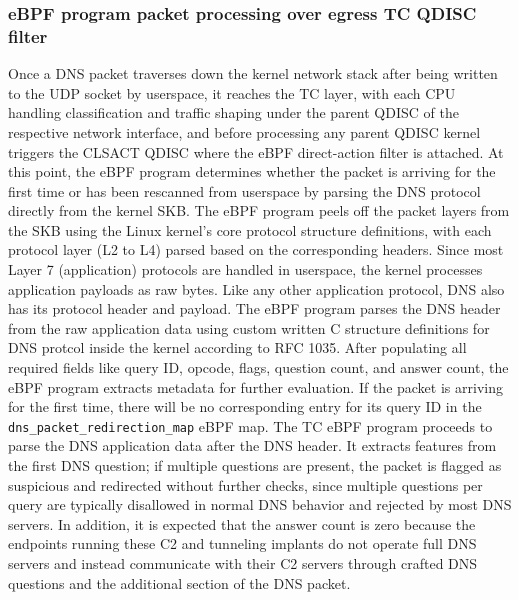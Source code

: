 \documentclass [11pt, proquest] {uwthesis}[2020/02/24]
\begin{document}
\subsubsection{\textbf{eBPF program packet processing over egress TC QDISC filter}}
\label{active:sec1}
Once a DNS packet traverses down the kernel network stack after being written to the UDP socket by userspace, it reaches the TC layer, with each CPU handling classification and traffic shaping under the parent QDISC of the respective network interface, and before processing any parent QDISC kernel triggers the CLSACT QDISC where the eBPF direct-action filter is attached. At this point, the eBPF program determines whether the packet is arriving for the first time or has been rescanned from userspace by parsing the DNS protocol directly from the kernel SKB. The eBPF program peels off the packet layers from the SKB using the Linux kernel’s core protocol structure definitions, with each protocol layer (L2 to L4) parsed based on the corresponding headers. Since most Layer 7 (application) protocols are handled in userspace, the kernel processes application payloads as raw bytes. Like any other application protocol, DNS also has its protocol header and payload. The eBPF program parses the DNS header from the raw application data using custom written C structure definitions for DNS protcol inside the kernel according to RFC 1035. After populating all required fields like query ID, opcode, flags, question count, and answer count, the eBPF program extracts metadata for further evaluation. If the packet is arriving for the first time, there will be no corresponding entry for its query ID in the \texttt{dns\_packet\_redirection\_map} eBPF map. The TC eBPF program proceeds to parse the DNS application data after the DNS header. It extracts features from the first DNS question; if multiple questions are present, the packet is flagged as suspicious and redirected without further checks, since multiple questions per query are typically disallowed in normal DNS behavior and rejected by most DNS servers. In addition, it is expected that the answer count is zero because the endpoints running these C2 and tunneling implants do not operate full DNS servers and instead communicate with their C2 servers through crafted DNS questions and the additional section of the DNS packet.
\end{document}

